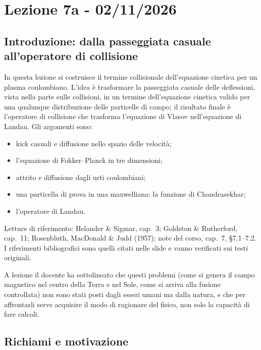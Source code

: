 \chapter{Lezione 7a - 02/11/2026}

\section{Introduzione: dalla passeggiata casuale all'operatore di collisione}
In questa lezione si costruisce il termine collisionale dell'equazione cinetica per un plasma coulombiano. L'idea è trasformare la passeggiata casuale delle deflessioni, vista nella parte sulle collisioni, in un termine dell'equazione cinetica valido per una qualunque distribuzione delle particelle di campo; il risultato finale è l'operatore di collisione che trasforma l'equazione di Vlasov nell'equazione di Landau. Gli argomenti sono:
\begin{itemize}
\item kick casuali e diffusione nello spazio delle velocità;
\item l'equazione di Fokker--Planck in tre dimensioni;
\item attrito e diffusione dagli urti coulombiani;
\item una particella di prova in una maxwelliana: la funzione di Chandrasekhar;
\item l'operatore di Landau.
\end{itemize}
Letture di riferimento: Helander \& Sigmar, cap.~3; Goldston \& Rutherford, cap.~11; Rosenbluth, MacDonald \& Judd (1957); note del corso, cap.~7, \S7.1--7.2. I riferimenti bibliografici sono quelli citati nelle slide e vanno verificati sui testi originali.

A lezione il docente ha sottolineato che questi problemi (come si genera il campo magnetico nel centro della Terra e nel Sole, come si arriva alla fusione controllata) non sono stati posti dagli esseri umani ma dalla natura, e che per affrontarli serve acquisire il modo di ragionare del fisico, non solo la capacità di fare calcoli.

\section{Richiami e motivazione}
